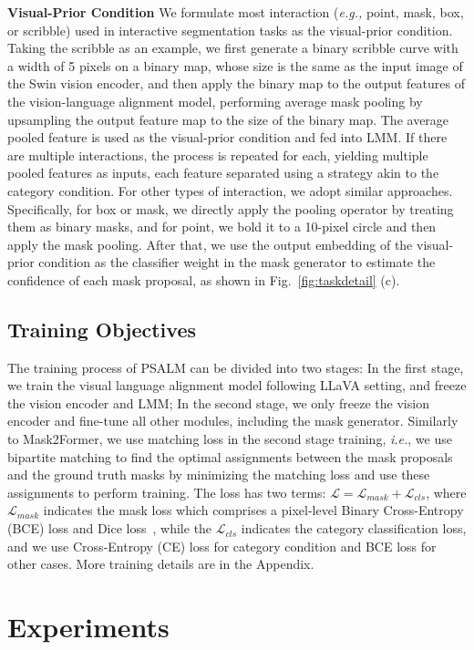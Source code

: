 \noindent\textbf{Visual-Prior Condition} We formulate most interaction (\textit{e.g.,} point, mask, box, or scribble) used in interactive segmentation tasks as the visual-prior condition. Taking the scribble as an example, we first generate a binary scribble curve with a width of 5 pixels on a binary map, whose size is the same as the input image of the Swin vision encoder, and then apply the binary map to the output features of the vision-language alignment model, performing average mask pooling by upsampling the output feature map to the size of the binary map. The average pooled feature is used as the visual-prior condition and fed into LMM. 
If there are multiple interactions, the process is repeated for each, yielding multiple pooled features as inputs, each feature separated using a strategy akin to the category condition. 
For other types of interaction, we adopt similar approaches. Specifically, for box or mask, we directly apply the pooling operator by treating them as binary masks, and for point, we bold it to a 10-pixel circle and then apply the mask pooling. 
After that, we use the output embedding of the visual-prior condition as the classifier weight in the mask generator to estimate the confidence of each mask proposal, as shown in Fig.~\ref{fig:taskdetail} (c).

\subsection{Training Objectives}
The training process of PSALM can be divided into two stages: In the first stage, we train the visual language alignment model following LLaVA setting, and freeze the vision encoder and LMM; In the second stage, we only freeze the vision encoder and fine-tune all other modules, including the mask generator. Similarly to Mask2Former, we use matching loss in the second stage training, \textit{i.e.}, we use bipartite matching to find the optimal assignments between the mask proposals and the ground truth masks by minimizing the matching loss and use these assignments to perform training. The loss has two terms: $\mathcal{L}=\mathcal{L}_{mask} + \mathcal{L}_{cls}$, where $\mathcal{L}_{mask}$ indicates the mask loss which comprises a pixel-level Binary Cross-Entropy (BCE) loss and Dice loss~\cite{DiceLoss}, while the $\mathcal{L}_{cls}$ indicates the category classification loss, and we use Cross-Entropy (CE) loss for category condition and BCE loss for other cases. More training details are in the Appendix. 

\section{Experiments}
